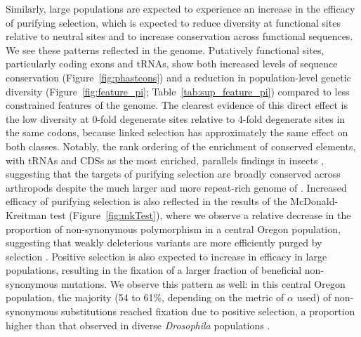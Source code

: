 Similarly, large populations are expected to experience an increase in the efficacy of
purifying selection, which is expected to reduce diversity at functional sites relative
to neutral sites and to increase conservation across functional sequences.
We see these patterns reflected in the \bgla{} genome.
Putatively functional sites, particularly coding exons and tRNAs, show both increased
levels of sequence conservation (Figure~\ref{fig:phastcons}) and a reduction in
population-level genetic diversity (Figure~\ref{fig:feature_pi};
Table~\ref{tab:sup_feature_pi}) compared to less constrained features of the genome.
The clearest evidence of this direct effect is the low
diversity at 0-fold degenerate sites relative to 4-fold degenerate sites in the same
codons, because linked selection has approximately the same effect on both classes.
Notably, the rank ordering of the enrichment of conserved elements, with tRNAs and CDSs
as the most enriched, parallels findings in insects \citep{siepel_evolutionarily_2005},
suggesting that the targets of purifying selection are broadly conserved across
arthropods despite the much larger and more repeat-rich genome of \bgla{}.
Increased efficacy of purifying selection is also reflected in the results of the
McDonald-Kreitman test (Figure~\ref{fig:mkTest}), where we observe a relative decrease
in the proportion of non-synonymous polymorphism in a central Oregon \bgla{} population,
suggesting that weakly deleterious variants are more efficiently purged by selection
\citep{li_reverse_2008}.
Positive selection is also expected to increase in efficacy in large populations,
resulting in the fixation of a larger fraction of beneficial non-synonymous mutations.
We observe this pattern as well: in this central Oregon population, the majority
(54 to 61\%, depending on the metric of $\alpha$ used) of non-synonymous substitutions
reached fixation due to positive selection, a proportion higher than that observed in
diverse \textit{Drosophila} populations \citep{haller_asymptoticmk_2017}.
\vspace{0.1cm}


